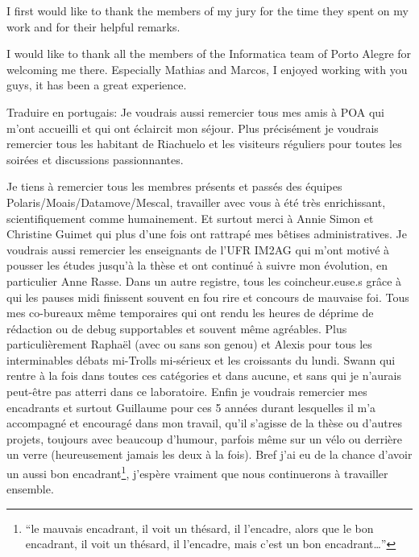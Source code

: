 

I first would like to thank the members of my jury for the time they spent on my work and for their helpful remarks.

I would like to thank all the members of the Informatica team of Porto Alegre for welcoming me there.
Especially Mathias and Marcos, I enjoyed working with you guys, it has been a great experience.

Traduire en portugais:
Je voudrais aussi remercier tous mes amis à POA qui m'ont accueilli et qui ont éclaircit mon séjour.
Plus précisément je voudrais remercier tous les habitant de Riachuelo et les visiteurs réguliers pour toutes les soirées et discussions passionnantes.

Je tiens à remercier tous les membres présents et passés des équipes Polaris/Moais/Datamove/Mescal, travailler avec vous à été très enrichissant, scientifiquement comme humainement.
Et surtout merci à Annie Simon et Christine Guimet qui plus d'une fois ont rattrapé mes bêtises administratives.
Je voudrais aussi remercier les enseignants de l'UFR IM2AG qui m'ont motivé à pousser les études jusqu'à la thèse et ont continué à suivre mon évolution, en particulier Anne Rasse.
Dans un autre registre, tous les coincheur.euse.s grâce à qui les pauses midi finissent souvent en fou rire et concours de mauvaise foi.
Tous mes co-bureaux même temporaires qui ont rendu les heures de déprime de rédaction ou de debug supportables et souvent même agréables.
Plus particulièrement Raphaël (avec ou sans son genou) et Alexis pour tous les interminables débats mi-Trolls mi-sérieux et les croissants du lundi.
Swann qui rentre à la fois dans toutes ces catégories et dans aucune, et sans qui je n'aurais peut-être pas atterri dans ce laboratoire.
Enfin je voudrais remercier mes encadrants et surtout Guillaume pour ces 5 années durant lesquelles il m'a accompagné et encouragé dans mon travail, qu'il s'agisse de la thèse ou d'autres projets, toujours avec beaucoup d'humour, parfois même sur un vélo ou derrière un verre (heureusement jamais les deux à la fois).
Bref j'ai eu de la chance d'avoir un aussi bon encadrant\footnote{
    “le mauvais encadrant, il voit un thésard, il l'encadre, alors que le bon encadrant, il voit un thésard, il l'encadre, mais c'est un bon encadrant\ldots”
}, j'espère vraiment que nous continuerons à travailler ensemble.

